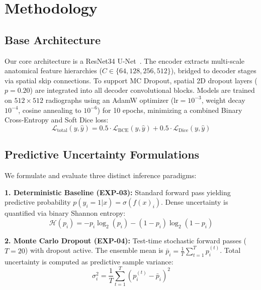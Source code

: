 \documentclass[11pt,a4paper]{article}
\begin{document}
\section{Methodology}
\label{sec:methodology}

\subsection{Base Architecture}
Our core architecture is a ResNet34 U-Net~\cite{ronneberger2015u, he2016deep}. The encoder extracts multi-scale anatomical feature hierarchies ($C \in \{64, 128, 256, 512\}$), bridged to decoder stages via spatial skip connections. To support MC Dropout, spatial 2D dropout layers ($p = 0.20$) are integrated into all decoder convolutional blocks. Models are trained on $512 \times 512$ radiographs using an AdamW optimizer ($\text{lr} = 10^{-3}$, weight decay $10^{-4}$, cosine annealing to $10^{-6}$) for 10 epochs, minimizing a combined Binary Cross-Entropy and Soft Dice loss:
\begin{equation}
    \mathcal{L}_{\text{total}}(y, \hat{y}) = 0.5 \cdot \mathcal{L}_{\text{BCE}}(y, \hat{y}) + 0.5 \cdot \mathcal{L}_{\text{Dice}}(y, \hat{y})
\end{equation}

\subsection{Predictive Uncertainty Formulations}
We formulate and evaluate three distinct inference paradigms:

\textbf{1. Deterministic Baseline (EXP-03):} Standard forward pass yielding predictive probability $p(y_i = 1 | x) = \sigma(f(x)_i)$. Dense uncertainty is quantified via binary Shannon entropy:
\begin{equation}
    \mathcal{H}(p_i) = -p_i \log_2(p_i) - (1 - p_i) \log_2(1 - p_i)
\end{equation}

\textbf{2. Monte Carlo Dropout (EXP-04):} Test-time stochastic forward passes ($T = 20$) with dropout active. The ensemble mean is $\bar{p}_i = \frac{1}{T} \sum_{t=1}^T p_i^{(t)}$. Total uncertainty is computed as predictive sample variance:
\begin{equation}
    \sigma_i^2 = \frac{1}{T} \sum_{t=1}^T (p_i^{(t)} - \bar{p}_i)^2
\end{equation}
\end{document}
